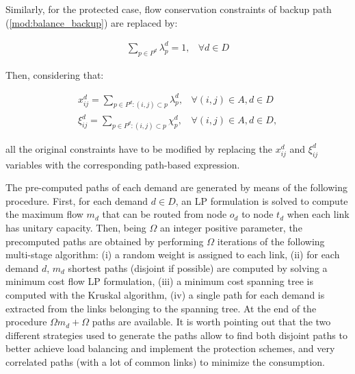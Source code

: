 \documentclass[final,5p,times,twocolumn]{elsarticle}
\begin{document}
\noindent Similarly, for the protected case, flow conservation constraints of backup path (\ref{mod:balance_backup}) are replaced by:

\begin{eqnarray}\label{mod:assign_backup}
\sum_{p \in P^{d}}\lambda_p^{d} = 1, & \forall d \in D
\end{eqnarray}

\noindent Then, considering that:

\begin{eqnarray}
\label{equivalence_primary}x_{ij}^{d} = \sum_{p \in P^{d}: (i,j) \subset p}\lambda_p^{d}, & \forall (i,j) \in A, d \in D \\
\label{equivalence_backup}\xi_{ij}^{d} = \sum_{p \in P^{d}: (i,j) \subset p}\chi_p^{d}, & \forall (i,j) \in A, d \in D,  
\end{eqnarray}

\noindent all the original constraints have to be modified by replacing the $x_{ij}^{d}$ and $\xi_{ij}^{d}$ variables with the corresponding path-based expression.


The pre-computed paths of each demand are generated by means of the following procedure. First, for each demand $d \in D$, an LP formulation is solved to compute the maximum flow $m_{d}$ that can be routed 
from node $o_d$ to node $t_d$ when each link has unitary capacity. Then, being $\Omega$ an integer positive parameter, the precomputed paths are obtained by performing $\Omega$ iterations of the following multi-stage algorithm: (i) a random weight is assigned to each link, (ii) for each demand $d$, $m_{d}$ shortest paths (disjoint if possible) are computed by solving a minimum cost flow LP formulation, (iii) a minimum cost spanning tree is computed with the Kruskal algorithm, (iv) a single path for each demand is extracted from the links belonging to the spanning tree. At the end of the procedure $\Omega m_{d} + \Omega$ paths are available. It is worth pointing out that the two different strategies used to generate the paths allow to  find both disjoint paths to better achieve load balancing  and implement the protection schemes, and very correlated paths (with a lot of common links) to minimize the consumption.
\end{document}
